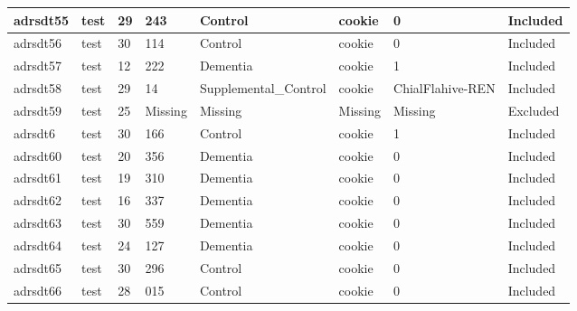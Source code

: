 \begin{center}
\begin{longtable}{|l|l|l|l|l|l|l|l|}
adrsdt55       & test                  & 29              & 243                & Control              & cookie          & 0                & Included      \\ \hline
adrsdt56       & test                  & 30              & 114                & Control              & cookie          & 0                & Included      \\ \hline
adrsdt57       & test                  & 12              & 222                & Dementia             & cookie          & 1                & Included      \\ \hline
adrsdt58       & test                  & 29              & 14                 & Supplemental\_Control & cookie          & ChialFlahive-REN & Included      \\ \hline
adrsdt59       & test                  & 25              & Missing            & Missing              & Missing         & Missing          & Excluded      \\ \hline
adrsdt6        & test                  & 30              & 166                & Control              & cookie          & 1                & Included      \\ \hline
adrsdt60       & test                  & 20              & 356                & Dementia             & cookie          & 0                & Included      \\ \hline
adrsdt61       & test                  & 19              & 310                & Dementia             & cookie          & 0                & Included      \\ \hline
adrsdt62       & test                  & 16              & 337                & Dementia             & cookie          & 0                & Included      \\ \hline
adrsdt63       & test                  & 30              & 559                & Dementia             & cookie          & 0                & Included      \\ \hline
adrsdt64       & test                  & 24              & 127                & Dementia             & cookie          & 0                & Included      \\ \hline
adrsdt65       & test                  & 30              & 296                & Control              & cookie          & 0                & Included      \\ \hline
adrsdt66       & test                  & 28              & 015                & Control              & cookie          & 0                & Included      \\ \hline

\end{longtable}
\end{center}
